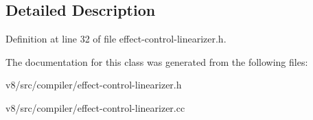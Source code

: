 \subsection{Detailed Description}


Definition at line 32 of file effect-\/control-\/linearizer.\+h.



The documentation for this class was generated from the following files\+:\begin{DoxyCompactItemize}
\item 
v8/src/compiler/effect-\/control-\/linearizer.\+h\item 
v8/src/compiler/effect-\/control-\/linearizer.\+cc\end{DoxyCompactItemize}
